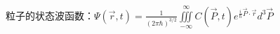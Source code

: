 \documentclass[UTF-8]{ctexart}
\begin{document}
粒子的状态波函数：$\varPsi (\vec{r},t)=\frac{1}{(2\pi \hbar )^{3/2}}\iiint\limits_{-\infty}^{\infty}{C(\vec{P},t)e^{\frac{i}{\hbar}\vec{P}\cdot \vec{r}}d^3\vec{P}}$
\end{document}
